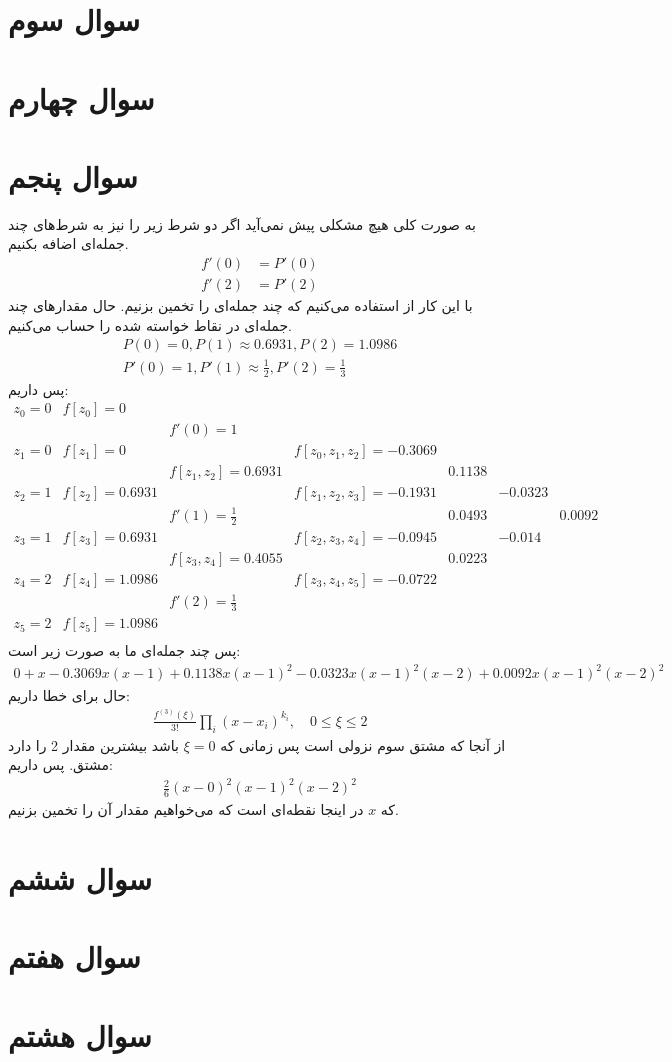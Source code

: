 \documentclass[]{article}
\begin{document}
\section*{سوال سوم}
\section*{سوال چهارم}
\section*{سوال پنجم}
به صورت کلی هیچ مشکلی پیش نمی‌آید اگر دو شرط زیر را نیز به شرط‌های چند جمله‌ای اضافه بکنیم.
\begin{align*}
    f'(0) &= P'(0)\\
    f'(2) &= P'(2)
\end{align*}
با این کار از
استفاده می‌کنیم که چند جمله‌ای را تخمین بزنیم.
حال مقدار‌های چند جمله‌ای در نقاط خواسته شده را حساب می‌کنیم.
\begin{gather*}
    P(0) = 0, P(1) \approx 0.6931, P(2) = 1.0986\\
    P'(0) = 1, P'(1) \approx \frac{1}{2}, P'(2) = \frac{1}{3}
\end{gather*}
پس داریم:
\[
\begin{array}{ccccccc}
z_0 = 0 & f[z_0] = 0 \\
&& f'(0) = 1 \\
z_1 = 0 & f[z_1] = 0 && f[z_0,z_1,z_2] = -0.3069\\
&& f[z_1,z_2] = 0.6931 && 0.1138\\
z_2 = 1 & f[z_2] = 0.6931 && f[z_1,z_2,z_3] = -0.1931 && -0.0323\\
&& f'(1) = \frac{1}{2} && 0.0493 && 0.0092\\
z_3 = 1 & f[z_3] = 0.6931 && f[z_2,z_3,z_4] = -0.0945 && -0.014 \\
&& f[z_3,z_4] = 0.4055 && 0.0223 \\
z_4 = 2 & f[z_4] = 1.0986&&f[z_3,z_4,z_5] = -0.0722\\
&&f'(2) = \frac{1}{3}\\
z_5 = 2 & f[z_5] = 1.0986\\
\end{array}
\]
پس چند جمله‌ای ما به صورت زیر است:
\begin{gather*}
    0 + x -0.3069 x (x-1) + 0.1138 x (x-1)^2 -0.0323 x (x-1)^2 (x-2) + 0.0092 x (x-1)^2 (x-2)^2
\end{gather*}
حال برای خطا داریم:
\begin{gather*}
    \frac{f^{(3)}(\xi)}{3!}\prod_i(x - x_i)^{k_i}, \quad 0 \le \xi \le 2
\end{gather*}
از آنجا که مشتق سوم نزولی است پس زمانی که
$\xi = 0$
باشد بیشترین مقدار 2 را دارد مشتق. پس داریم:
\begin{gather*}
    \frac{2}{6} (x - 0)^2 (x - 1)^2 (x - 2)^2 
\end{gather*}
که
$x$
در اینجا نقطه‌‌ای است که می‌خواهیم مقدار آن را تخمین بزنیم.
\section*{سوال ششم}
\section*{سوال هفتم}
\section*{سوال هشتم}
\end{document}
